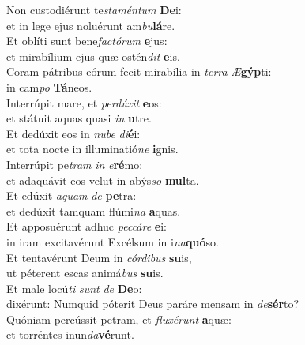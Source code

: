 \oddverse Non custodiérunt te\textit{sta}\textit{mén}\textit{tum} \textbf{De}i:~\*\\
\oddverse et in lege ejus noluérunt am\textit{bu}\textbf{lá}re.\\
\evenverse Et oblíti sunt bene\textit{fa}\textit{ctó}\textit{rum} \textbf{e}jus:~\*\\
\evenverse et mirabílium ejus quæ ostén\textit{dit} \textbf{e}is.\\
\oddverse Coram pátribus eórum fecit mirabília in \textit{ter}\textit{ra} \textit{Æ}\textbf{gýp}ti:~\*\\
\oddverse in cam\textit{po} \textbf{Tá}neos.\\
\evenverse Interrúpit mare, et \textit{per}\textit{dú}\textit{xit} \textbf{e}os:~\*\\
\evenverse et státuit aquas quasi \textit{in} \textbf{u}tre.\\
\oddverse Et dedúxit eos in \textit{nu}\textit{be} \textit{di}\textbf{é}i:~\*\\
\oddverse et tota nocte in illuminatió\textit{ne} \textbf{i}gnis.\\
\evenverse Interrúpit pe\textit{tram} \textit{in} \textit{e}\textbf{ré}mo:~\*\\
\evenverse et adaquávit eos velut in abýs\textit{so} \textbf{mul}ta.\\
\oddverse Et edúxit \textit{a}\textit{quam} \textit{de} \textbf{pe}tra:~\*\\
\oddverse et dedúxit tamquam flúmi\textit{na} \textbf{a}quas.\\
\evenverse Et apposuérunt adhuc \textit{pec}\textit{cá}\textit{re} \textbf{e}i:~\*\\
\evenverse in iram excitavérunt Excélsum in i\textit{na}\textbf{quó}so.\\
\oddverse Et tentavérunt Deum in \textit{cór}\textit{di}\textit{bus} \textbf{su}is,~\*\\
\oddverse ut péterent escas animá\textit{bus} \textbf{su}is.\\
\evenverse Et male locú\textit{ti} \textit{sunt} \textit{de} \textbf{De}o:~\*\\
\evenverse dixérunt: Numquid póterit Deus paráre mensam in \textit{de}\textbf{sér}to?\\
\oddverse Quóniam percússit petram, et \textit{flu}\textit{xé}\textit{runt} \textbf{a}quæ:~\*\\
\oddverse et torréntes inun\textit{da}\textbf{vé}runt.\\
